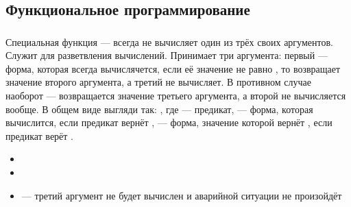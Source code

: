 \documentclass[a4paper, 12pt, titlepage, twoside]{article}
\newenvironment{examples}
               {\begin{itemize}\renewcommand{\labelitemi}{ }}
               {\end{itemize}}
\begin{document}
\subsection{Функциональное программирование}


\begin{verb}
\subsubsection{}
Специальная функция --- всегда не вычисляет один из трёх своих аргументов. Служит для разветвления вычислений. Принимает три аргумента: первый --- форма, которая всегда вычислячется, если её значение не равно , то  возвращает значение второго аргумента, а третий не вычисляет. В противном случае наоборот --- возвращается значение третьего аргумента, а второй не вычисляется вообще. В общем виде выгляди так: , где  --- предикат,  --- форма, которая вычислится, если предикат вернёт ,  --- форма, значение которой вернёт , если предикат верёт .
\begin{examples}
  \item {}
  \item {}
  \item {} --- третий аргумент не будет вычислен и аварийной ситуации не произойдёт
\end{examples}
\end{verb}
\end{document}
